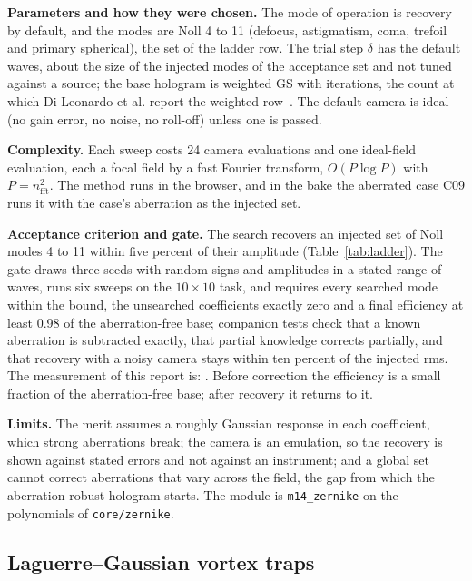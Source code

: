 \textbf{Parameters and how they were chosen.} The mode of operation is recovery by default, and the modes are Noll 4 to 11 (defocus, astigmatism, coma, trefoil and primary spherical), the set of the ladder row. The trial step $\delta$ has the default  waves, about the size of the injected modes of the acceptance set and not tuned against a source; the base hologram is weighted GS with  iterations, the count at which Di Leonardo et al. report the weighted row~\cite{dileonardo}. The default camera is ideal (no gain error, no noise, no roll-off) unless one is passed.

\textbf{Complexity.} Each sweep costs 24 camera evaluations and one ideal-field evaluation, each a focal field by a fast Fourier transform, $O(P\log P)$ with $P=n_{\mathrm{fft}}^2$. The method runs in the browser, and in the bake the aberrated case C09 runs it with the case's aberration as the injected set.

\textbf{Acceptance criterion and gate.} The search recovers an injected set of Noll modes 4 to 11 within five percent of their amplitude (Table~\ref{tab:ladder}). The gate draws three seeds with random signs and amplitudes in a stated range of waves, runs six sweeps on the $10\times10$ task, and requires every searched mode within the bound, the unsearched coefficients exactly zero and a final efficiency at least 0.98 of the aberration-free base; companion tests check that a known aberration is subtracted exactly, that partial knowledge corrects partially, and that recovery with a noisy camera stays within ten percent of the injected rms. The measurement of this report is: . Before correction the efficiency is a small fraction of the aberration-free base; after recovery it returns to it.

\textbf{Limits.} The merit assumes a roughly Gaussian response in each coefficient, which strong aberrations break; the camera is an emulation, so the recovery is shown against stated errors and not against an instrument; and a global set cannot correct aberrations that vary across the field, the gap from which the aberration-robust hologram starts. The module is \texttt{m14\_zernike} on the polynomials of \texttt{core/zernike}.

\subsection{Laguerre--Gaussian vortex traps}\label{sec:m15}

